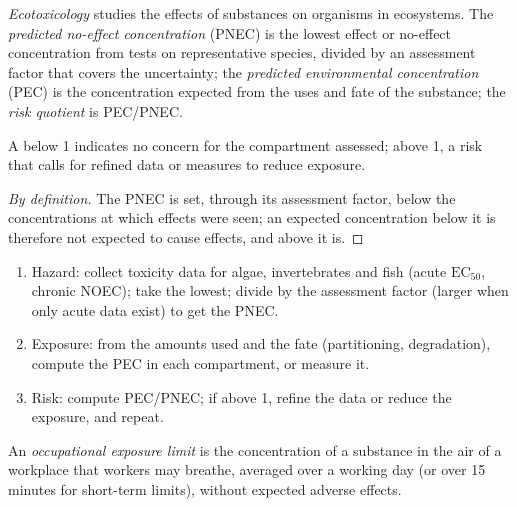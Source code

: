 \begin{definition}[Ecotoxicology]\label{def:b3:environmental-toxicology:ecotoxicology}
\emph{Ecotoxicology} studies the effects of substances on
organisms in ecosystems. The \emph{predicted no-effect
concentration} (PNEC) is the lowest
effect or no-effect concentration from tests on representative species,
divided by an assessment factor that covers the uncertainty; the
\emph{predicted environmental concentration}
(PEC) is the concentration expected from the uses and fate of the
substance; the \emph{risk quotient} is PEC/PNEC.
\end{definition}

\begin{proposition}\label{prop:b3:environmental-toxicology:risk-quotient}
A  below 1 indicates no concern for the compartment assessed; above
1, a risk that calls for refined data or measures to reduce exposure.
\end{proposition}

\begin{proof}[By definition]
The PNEC is set, through its assessment factor, below the concentrations at which
effects were seen; an expected concentration below it is therefore not
expected to cause effects, and above it is.
\end{proof}

\begin{method}\label{met:b3:environmental-toxicology:risk}
\begin{enumerate}
  \item Hazard: collect toxicity data for algae, invertebrates and fish (acute
        $\mathrm{EC_{50}}$, chronic NOEC); take the lowest; divide by the assessment factor (larger when
        only acute data exist) to get the PNEC.
  \item Exposure: from the amounts used and the fate (partitioning, degradation),
        compute the PEC in each compartment, or measure it.
  \item Risk: compute PEC/PNEC; if above 1, refine the data or reduce the
        exposure, and repeat.
\end{enumerate}
\end{method}

\begin{definition}\label{def:b3:environmental-toxicology:oel}
An \emph{occupational exposure limit} is the
concentration of a substance in the air of a workplace that workers may breathe,
averaged over a working day (or over 15 minutes for short-term limits), without
expected adverse effects.
\end{definition}

